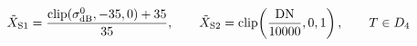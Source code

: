\documentclass[preview]{standalone}
\begin{document}
\begin{align*}
\special{dvisvgm:raw <g id='unique000'>}\tilde{X}_{\text{S1}} = \frac{\text{clip}(\sigma^0_{\text{dB}}, -35, 0) + 35}{35}, \qquad \tilde{X}_{\text{S2}} = \text{clip}\!\left(\frac{\text{DN}}{10000}, 0, 1\right), \qquad T \in D_4\special{dvisvgm:raw </g>}
\end{align*}
\end{document}
